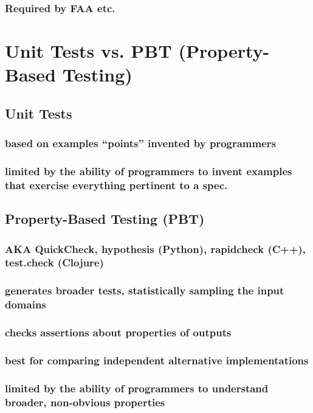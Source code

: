 \documentclass[10pt,oneside,x11names]{article}
\begin{document}
\subsubsection{Required by FAA etc.}
\label{sec:orga7dea04}
\section{Unit Tests vs. PBT (Property-Based Testing)}
\label{sec:org406477c}
\subsection{Unit Tests}
\label{sec:org388605c}
\subsubsection{based on examples ``points'' invented by programmers}
\label{sec:orga11cb86}
\subsubsection{limited by the ability of programmers to invent examples that exercise everything pertinent to a spec.}
\label{sec:org076ab6b}
\subsection{Property-Based Testing (PBT)}
\label{sec:orgf346470}
\subsubsection{AKA QuickCheck, hypothesis (Python), rapidcheck (C++), test.check (Clojure)}
\label{sec:orgef2275d}
\subsubsection{generates broader tests, statistically sampling the input domains}
\label{sec:org71336df}
\subsubsection{checks assertions about properties of outputs}
\label{sec:org6284c8b}
\subsubsection{best for comparing independent alternative implementations}
\label{sec:org74ba032}
\subsubsection{limited by the ability of programmers to understand broader, non-obvious properties}
\label{sec:orgbec8507}
\end{document}
